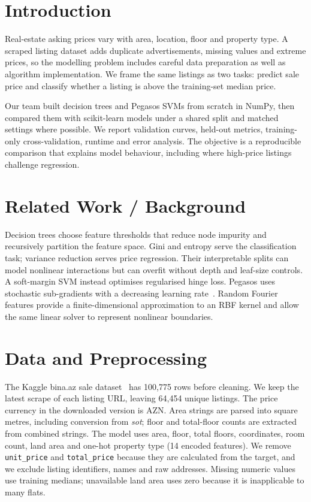 \documentclass[10pt,twocolumn,a4paper]{article}
\begin{document}
\section{Introduction}
Real-estate asking prices vary with area, location, floor and property
type. A scraped listing dataset adds duplicate advertisements, missing
values and extreme prices, so the modelling problem includes careful
data preparation as well as algorithm implementation. We frame the
same listings as two tasks: predict sale price and classify whether a
listing is above the training-set median price.

Our team built decision trees and Pegasos SVMs from scratch in NumPy,
then compared them with scikit-learn models under a shared split and
matched settings where possible. We report validation curves, held-out
metrics, training-only cross-validation, runtime and error analysis.
The objective is a reproducible comparison that explains model behaviour,
including where high-price listings challenge regression.

\section{Related Work / Background}
Decision trees choose feature thresholds that reduce node impurity and
recursively partition the feature space. Gini and entropy serve the
classification task; variance reduction serves price regression.
Their interpretable splits can model nonlinear interactions but can
overfit without depth and leaf-size controls. A soft-margin SVM instead
optimises regularised hinge loss. Pegasos uses stochastic sub-gradients
with a decreasing learning rate~\cite{pegasos}. Random Fourier features
provide a finite-dimensional approximation to an RBF kernel and allow
the same linear solver to represent nonlinear boundaries.

\section{Data and Preprocessing}
The Kaggle bina.az sale dataset~\cite{binaaz} has 100,775 rows before
cleaning. We keep the latest scrape of each listing URL, leaving 64,454
unique listings. The price currency in the downloaded version is AZN.
Area strings are parsed into square metres, including conversion from
\emph{sot}; floor and total-floor counts are extracted from combined
strings. The model uses area, floor, total floors, coordinates, room
count, land area and one-hot property type (14 encoded features).
We remove \texttt{unit\_price} and \texttt{total\_price} because they
are calculated from the target, and we exclude listing identifiers,
names and raw addresses. Missing numeric values use training medians;
unavailable land area uses zero because it is inapplicable to many flats.
\end{document}

